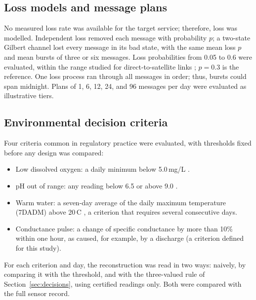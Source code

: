 \subsection{Loss models and message plans}
\label{sec:channels}
No measured loss rate was available for the target service; therefore, loss was modelled. Independent loss removed each message with probability $p$; a two-state Gilbert channel \citep{gilbert1960,elliott1963} lost every message in its bad state, with the same mean loss $p$ and mean bursts of three or six messages. Loss probabilities from 0.05 to 0.6 were evaluated, within the range studied for direct-to-satellite links \citep{tondo2021}; $p = 0.3$ is the reference. One loss process ran through all messages in order; thus, bursts could span midnight. Plans of 1, 6, 12, 24, and 96 messages per day were evaluated as illustrative tiers.

\subsection{Environmental decision criteria}
\label{sec:criteria}
Four criteria common in regulatory practice were evaluated, with thresholds fixed before any design was compared:
\begin{itemize}
  \item Low dissolved oxygen: a daily minimum below 5.0\,mg/L \citep{epa1986do}.
  \item pH out of range: any reading below 6.5 or above 9.0 \citep{epa1986gold}.
  \item Warm water: a seven-day average of the daily maximum temperature (7DADM) above 20\,\textdegree C \citep{epa2003temp}, a criterion that requires several consecutive days.
  \item Conductance pulse: a change of specific conductance by more than 10\% within one hour, as caused, for example, by a discharge (a criterion defined for this study).
\end{itemize}
For each criterion and day, the reconstruction was read in two ways: naively, by comparing it with the threshold, and with the three-valued rule of Section~\ref{sec:decisions}, using certified readings only. Both were compared with the full sensor record.

